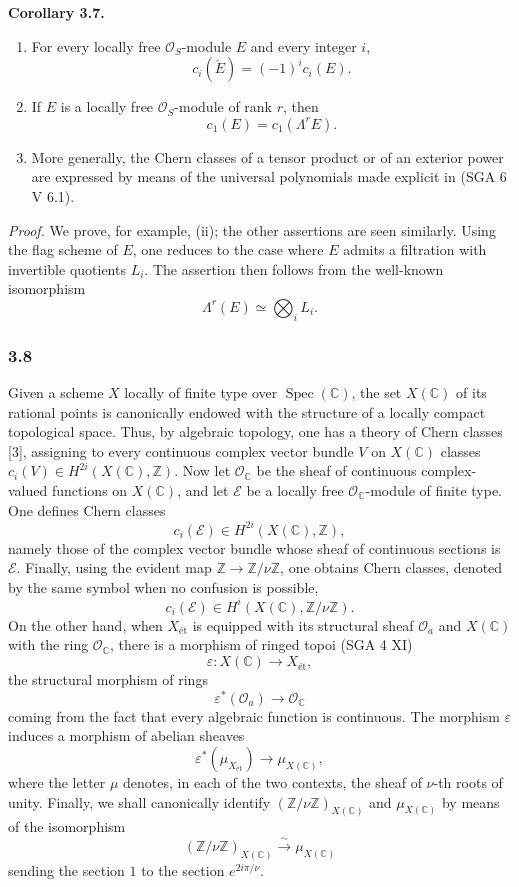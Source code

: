 \documentclass[11pt]{article}
\newenvironment{statement}[1]{\par\medskip\noindent\textbf{#1.}\ }{\par\medskip}
\begin{document}
\begin{statement}{Corollary 3.7}
\begin{enumerate}[label=(\roman*)]
\item For every locally free $\mathcal O_S$-module $E$ and every integer $i$,
\[
c_i(\check E)=(-1)^i c_i(E).
\]
\item If $E$ is a locally free $\mathcal O_S$-module of rank $r$, then
\[
c_1(E)=c_1(\Lambda^rE).
\]
\item More generally, the Chern classes of a tensor product or of an exterior power are expressed by means of the universal polynomials made explicit in (SGA 6 V 6.1).
\end{enumerate}
\end{statement}

\emph{Proof.} We prove, for example, (ii); the other assertions are seen similarly. Using the flag scheme of $E$, one reduces to the case where $E$ admits a filtration with invertible quotients $L_i$. The assertion then follows from the well-known isomorphism
\[
\Lambda^r(E)\simeq\bigotimes_i L_i.
\]

\subsubsection*{3.8}
Given a scheme $X$ locally of finite type over $\operatorname{Spec}(\mathbb C)$, the set $X(\mathbb C)$ of its rational points is canonically endowed with the structure of a locally compact topological space. Thus, by algebraic topology, one has a theory of Chern classes [3], assigning to every continuous complex vector bundle $V$ on $X(\mathbb C)$ classes $c_i(V)\in H^{2i}(X(\mathbb C),\mathbb Z)$. Now let $\mathcal O_\mathbb C$ be the sheaf of continuous complex-valued functions on $X(\mathbb C)$, and let $\mathcal E$ be a locally free $\mathcal O_\mathbb C$-module of finite type. One defines Chern classes
\[
c_i(\mathcal E)\in H^{2i}(X(\mathbb C),\mathbb Z),
\]
namely those of the complex vector bundle whose sheaf of continuous sections is $\mathcal E$. Finally, using the evident map $\mathbb Z\to\mathbb Z/\nu\mathbb Z$, one obtains Chern classes, denoted by the same symbol when no confusion is possible,
\[
c_i(\mathcal E)\in H^i(X(\mathbb C),\mathbb Z/\nu\mathbb Z).
\tag{3.8.1}
\]
On the other hand, when $X_{\mathrm{ét}}$ is equipped with its structural sheaf $\mathcal O_a$ and $X(\mathbb C)$ with the ring $\mathcal O_\mathbb C$, there is a morphism of ringed topoi (SGA 4 XI)
\[
\varepsilon:X(\mathbb C)\to X_{\mathrm{ét}},
\]
the structural morphism of rings
\[
\varepsilon^*(\mathcal O_a)\to\mathcal O_\mathbb C
\tag{3.8.2}
\]
coming from the fact that every algebraic function is continuous. The morphism $\varepsilon$ induces a morphism of abelian sheaves
\[
\varepsilon^*(\mu_{X_{\mathrm{ét}}})\to \mu_{X(\mathbb C)},
\tag{3.8.3}
\]
where the letter $\mu$ denotes, in each of the two contexts, the sheaf of $\nu$-th roots of unity. Finally, we shall canonically identify $(\mathbb Z/\nu\mathbb Z)_{X(\mathbb C)}$ and $\mu_{X(\mathbb C)}$ by means of the isomorphism
\[
(\mathbb Z/\nu\mathbb Z)_{X(\mathbb C)}
 \xrightarrow{\sim}\mu_{X(\mathbb C)}
\tag{3.8.4}
\]
sending the section $1$ to the section $e^{2i\pi/\nu}$.
\end{document}
